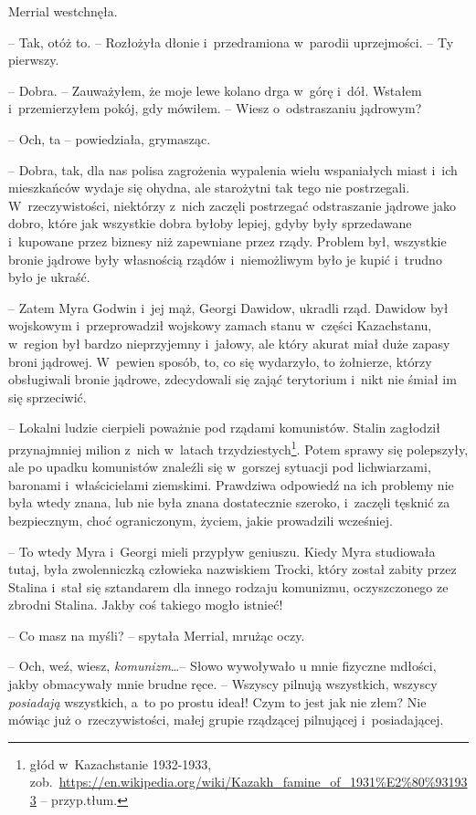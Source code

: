 \documentclass[oneside,polish,11pt,sfheadings]{mwbk}
\begin{document}
Merrial westchnęła. 

-- Tak, otóż to. -- Rozłożyła dłonie i~przedramiona w~parodii uprzejmości. -- Ty pierwszy.

-- Dobra. -- Zauważyłem, że moje lewe kolano drga w~górę i~dół. Wstałem i~przemierzyłem pokój, gdy mówiłem. -- Wiesz o~odstraszaniu jądrowym?

-- Och, ta -- powiedziała, grymasząc.

-- Dobra, tak, dla nas polisa zagrożenia wypalenia wielu wspaniałych
miast i~ich mieszkańców wydaje się ohydna, ale starożytni tak tego nie
postrzegali. W~rzeczywistości, niektórzy z~nich zaczęli postrzegać
odstraszanie jądrowe jako dobro, które jak wszystkie dobra byłoby
lepiej, gdyby były sprzedawane i~kupowane przez biznesy niż zapewniane
przez rządy. Problem był, wszystkie bronie jądrowe były własnością
rządów i~niemożliwym było je kupić i~trudno było je ukraść.

-- Zatem Myra Godwin i~jej mąż, Georgi Dawidow, ukradli rząd. Dawidow był
wojskowym i~przeprowadził wojskowy zamach stanu w~części Kazachstanu, w~region był bardzo nieprzyjemny i~jałowy, ale który akurat miał duże
zapasy broni jądrowej. W~pewien sposób, to, co się wydarzyło, to
żołnierze, którzy obsługiwali bronie jądrowe, zdecydowali się zająć
terytorium i~nikt nie śmiał im się sprzeciwić.

-- Lokalni ludzie cierpieli poważnie pod rządami komunistów. Stalin
zagłodził przynajmniej milion z~nich w~latach trzydziestych\footnote{ głód w~Kazachstanie 1932-1933,
zob.~\url{https://en.wikipedia.org/wiki/Kazakh\_famine\_of\_1931\%E2\%80\%931933}
-- przyp.tłum.}. Potem sprawy się polepszyły, ale po upadku
komunistów znaleźli się w~gorszej sytuacji pod lichwiarzami, baronami i~właścicielami ziemskimi. Prawdziwa odpowiedź na ich problemy nie była
wtedy znana, lub nie była znana dostatecznie szeroko, i~zaczęli tęsknić
za bezpiecznym, choć ograniczonym, życiem, jakie prowadzili wcześniej.

-- To wtedy Myra i~Georgi mieli przypływ geniuszu. Kiedy Myra studiowała
tutaj, była zwolenniczką człowieka nazwiskiem Trocki, który został
zabity przez Stalina i~stał się sztandarem dla innego rodzaju komunizmu,
oczyszczonego ze zbrodni Stalina. Jakby coś takiego mogło istnieć!

-- Co masz na myśli? -- spytała Merrial, mrużąc oczy.

-- Och, weź, wiesz, \textit{komunizm}\ldots -- Słowo wywoływało u mnie fizyczne
mdłości, jakby obmacywały mnie brudne ręce. -- Wszyscy pilnują
wszystkich, wszyscy \textit{posiadają} wszystkich, a~to po prostu ideał!
Czym to jest jak nie złem? Nie mówiąc już o~rzeczywistości, małej grupie
rządzącej pilnującej i~posiadającej.
\end{document}
